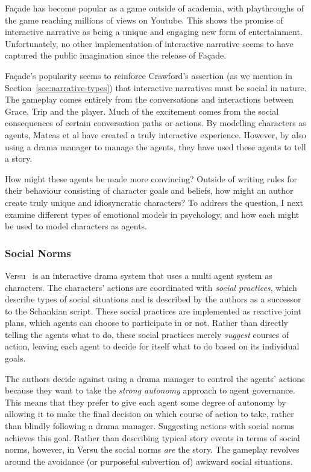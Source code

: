 \documentclass[11pt]{report}
\begin{document}
Fa\c{c}ade has become popular as a game outside of academia, with playthroughs of the game reaching millions of views on Youtube. This shows the promise of interactive narrative as being a unique and engaging new form of entertainment. Unfortunately, no other implementation of interactive narrative seems to have captured the public imagination since the release of Fa\c{c}ade.

Fa\c{c}ade's popularity seems to reinforce Crawford's assertion (as we mention in Section~\ref{sec:narrative-types}) that interactive narratives must be social in nature. The gameplay comes entirely from the conversations and interactions between Grace, Trip and the player. Much of the excitement comes from the social consequences of certain conversation paths or actions. By modelling characters as agents, Mateas et al have created a truly interactive experience. However, by also using a drama manager to manage the agents, they have used these agents to tell a story.

How might these agents be made more convincing? Outside of writing rules for their behaviour consisting of character goals and beliefs, how might an author create truly unique and idiosyncratic characters? To address the question, I next examine different types of emotional models in psychology, and how each might be used to model characters as agents.

\subsubsection{Social Norms}
Versu~\citep{evans2014versu} is an interactive drama system that uses a multi agent system as characters. The characters' actions are coordinated with \emph{social practices}, which describe types of social situations and is described by the authors as a successor to the Schankian script. These social practices are implemented as reactive joint plans, which agents can choose to participate in or not. Rather than directly telling the agents what to do, these social practices merely \emph{suggest} courses of action, leaving each agent to decide for itself what to do based on its individual goals.

The authors decide against using a drama manager to control the agents' actions because they want to take the \emph{strong autonomy} approach to agent governance. This means that they prefer to give each agent some degree of autonomy by allowing it to make the final decision on which course of action to take, rather than blindly following a drama manager. Suggesting actions with social norms achieves this goal. Rather than describing typical story events in terms of social norms, however, in Versu the social norms \emph{are} the story. The gameplay revolves around the avoidance (or purposeful subvertion of) awkward social situations.
\end{document}
